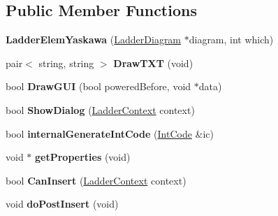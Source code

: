 \subsection*{Public Member Functions}
\begin{DoxyCompactItemize}
\item 
\hypertarget{class_ladder_elem_yaskawa_ad67d0055087d4bd8088acb214760fa6f}{{\bfseries Ladder\-Elem\-Yaskawa} (\hyperlink{class_ladder_diagram}{Ladder\-Diagram} $\ast$diagram, int which)}\label{class_ladder_elem_yaskawa_ad67d0055087d4bd8088acb214760fa6f}

\item 
\hypertarget{class_ladder_elem_yaskawa_a23677d298d3ff7392165596adff0ff02}{pair$<$ string, string $>$ {\bfseries Draw\-T\-X\-T} (void)}\label{class_ladder_elem_yaskawa_a23677d298d3ff7392165596adff0ff02}

\item 
\hypertarget{class_ladder_elem_yaskawa_aa66fa585297f2673627caa0aea9c5b5d}{bool {\bfseries Draw\-G\-U\-I} (bool powered\-Before, void $\ast$data)}\label{class_ladder_elem_yaskawa_aa66fa585297f2673627caa0aea9c5b5d}

\item 
\hypertarget{class_ladder_elem_yaskawa_ac7cffe3d069c324c4f0de871876394a8}{bool {\bfseries Show\-Dialog} (\hyperlink{struct_ladder_context}{Ladder\-Context} context)}\label{class_ladder_elem_yaskawa_ac7cffe3d069c324c4f0de871876394a8}

\item 
\hypertarget{class_ladder_elem_yaskawa_affebaaf8a63e2eee0cf5afb962242ead}{bool {\bfseries internal\-Generate\-Int\-Code} (\hyperlink{class_int_code}{Int\-Code} \&ic)}\label{class_ladder_elem_yaskawa_affebaaf8a63e2eee0cf5afb962242ead}

\item 
\hypertarget{class_ladder_elem_yaskawa_aea09458057dd6f47b051df180e34043a}{void $\ast$ {\bfseries get\-Properties} (void)}\label{class_ladder_elem_yaskawa_aea09458057dd6f47b051df180e34043a}

\item 
\hypertarget{class_ladder_elem_yaskawa_a94995c0dc03048e8cb8cfc78f2bf40fe}{bool {\bfseries Can\-Insert} (\hyperlink{struct_ladder_context}{Ladder\-Context} context)}\label{class_ladder_elem_yaskawa_a94995c0dc03048e8cb8cfc78f2bf40fe}

\item 
\hypertarget{class_ladder_elem_yaskawa_af3814181d768377f9ee1f2396cf10b6b}{void {\bfseries do\-Post\-Insert} (void)}\label{class_ladder_elem_yaskawa_af3814181d768377f9ee1f2396cf10b6b}


\end{DoxyCompactItemize}
